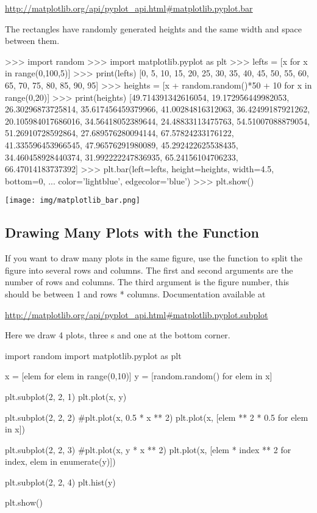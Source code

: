 \documentclass[11pt]{cselabheader}
\begin{document}
\begin{center}
\url{http://matplotlib.org/api/pyplot_api.html#matplotlib.pyplot.bar}
\end{center}


The rectangles have randomly generated heights and the same width and space
between them.

\begin{pyconcode}
>>> import random
>>> import matplotlib.pyplot as plt
>>> lefts = [x for x in range(0,100,5)]
>>> print(lefts)
[0, 5, 10, 15, 20, 25, 30, 35, 40, 45, 50, 55, 60, 65, 70, 75, 80, 85, 90, 95]
>>> heights = [x + random.random()*50 + 10 for x in range(0,20)]
>>> print(heights)
[49.714391342616054, 19.172956449982053, 26.30296873725814, 35.617456459379966,
 41.00284816312063, 36.42499187921262, 20.105984017686016, 34.56418052389644,
 24.48833113475763, 54.51007088879054, 51.26910728592864, 27.689576280094144,
 67.57824233176122, 41.335596453966545, 47.96576291980089, 45.292422625538435,
 34.460458928440374, 31.992222247836935, 65.24156104706233, 66.47014183737392]
>>> plt.bar(left=lefts, height=heights, width=4.5, bottom=0,
...         color='lightblue', edgecolor='blue')
>>> plt.show()
\end{pyconcode}

\begin{center}
\texttt{[image: img/matplotlib\_bar.png]}
\end{center}

\subsection{Drawing Many Plots with the 
Function}

If you want to draw many plots in the same figure, use the
 function to split the figure into several rows
and columns. The first and second arguments are the number of rows and columns.
The third argument is the figure number, this should be between 1 and
rows * columns. Documentation available at

\begin{center}
\url{http://matplotlib.org/api/pyplot_api.html#matplotlib.pyplot.subplot}
\end{center}

Here we draw 4 plots, three s and one
 at the bottom corner.

\begin{python3code}
import random
import matplotlib.pyplot as plt

x = [elem for elem in range(0,10)]
y = [random.random() for elem in x]

plt.subplot(2, 2, 1)
plt.plot(x, y)

plt.subplot(2, 2, 2)
#plt.plot(x, 0.5 * x ** 2)
plt.plot(x, [elem ** 2 * 0.5 for elem in x])

plt.subplot(2, 2, 3)
#plt.plot(x, y * x ** 2)
plt.plot(x, [elem * index ** 2 for index, elem in enumerate(y)])

plt.subplot(2, 2, 4)
plt.hist(y)

plt.show()
\end{python3code}
\end{document}
